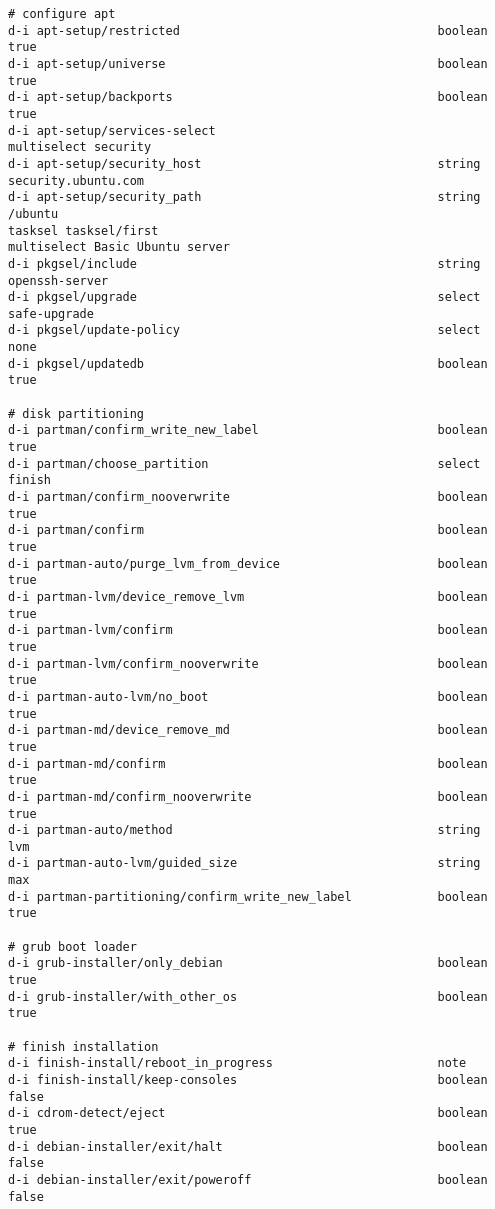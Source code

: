 \begin{lstlisting}[style=json, basicstyle=\ttfamily\tiny]
# configure apt
d-i apt-setup/restricted                                    boolean     true
d-i apt-setup/universe                                      boolean     true
d-i apt-setup/backports                                     boolean     true
d-i apt-setup/services-select                               multiselect security
d-i apt-setup/security_host                                 string      security.ubuntu.com
d-i apt-setup/security_path                                 string      /ubuntu
tasksel tasksel/first                                       multiselect Basic Ubuntu server
d-i pkgsel/include 					    					string 		openssh-server
d-i pkgsel/upgrade                                          select      safe-upgrade
d-i pkgsel/update-policy                                    select      none
d-i pkgsel/updatedb                                         boolean     true

# disk partitioning
d-i partman/confirm_write_new_label                         boolean     true
d-i partman/choose_partition                                select      finish
d-i partman/confirm_nooverwrite                             boolean     true
d-i partman/confirm                                         boolean     true
d-i partman-auto/purge_lvm_from_device                      boolean     true
d-i partman-lvm/device_remove_lvm                           boolean     true
d-i partman-lvm/confirm                                     boolean     true
d-i partman-lvm/confirm_nooverwrite                         boolean     true
d-i partman-auto-lvm/no_boot                                boolean     true
d-i partman-md/device_remove_md                             boolean     true
d-i partman-md/confirm                                      boolean     true
d-i partman-md/confirm_nooverwrite                          boolean     true
d-i partman-auto/method                                     string      lvm
d-i partman-auto-lvm/guided_size                            string      max
d-i partman-partitioning/confirm_write_new_label            boolean     true

# grub boot loader
d-i grub-installer/only_debian                              boolean     true
d-i grub-installer/with_other_os                            boolean     true

# finish installation
d-i finish-install/reboot_in_progress                       note
d-i finish-install/keep-consoles                            boolean     false
d-i cdrom-detect/eject                                      boolean     true
d-i debian-installer/exit/halt                              boolean     false
d-i debian-installer/exit/poweroff                          boolean     false
\end{lstlisting}